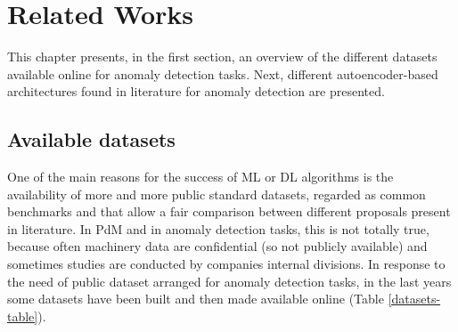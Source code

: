 \chapter{Related Works}
This chapter presents, in the first section, an overview of the different datasets available online for anomaly detection tasks. Next, different autoencoder-based architectures found in literature for anomaly detection are presented.

\section{Available datasets}
One of the main reasons for the success of ML or DL algorithms is the availability of more and more public standard datasets, regarded as common benchmarks and that allow a fair comparison between different proposals present in literature. In PdM and in anomaly detection tasks, this is not totally true, because often machinery data are confidential (so not publicly available) and sometimes studies are conducted by companies internal divisions. In response to the need of public dataset arranged for anomaly detection tasks, in the last years some datasets have been built and then made available online (Table \ref{datasets-table}).\\

